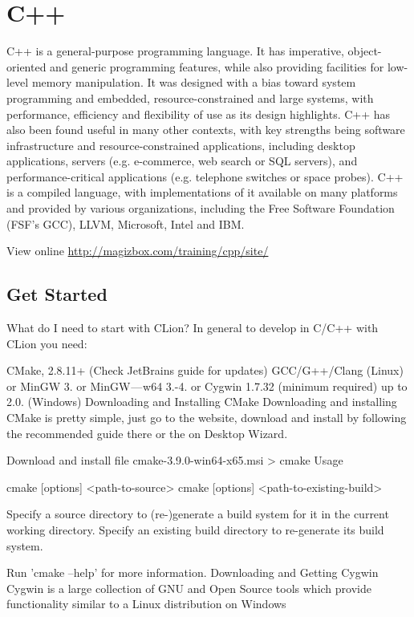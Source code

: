 \chapter{C++}


C++ is a general-purpose programming language. It has imperative, object-oriented and generic programming features, while also providing facilities for low-level memory manipulation. It was designed with a bias toward system programming and embedded, resource-constrained and large systems, with performance, efficiency and flexibility of use as its design highlights. C++ has also been found useful in many other contexts, with key strengths being software infrastructure and resource-constrained applications, including desktop applications, servers (e.g. e-commerce, web search or SQL servers), and performance-critical applications (e.g. telephone switches or space probes). C++ is a compiled language, with implementations of it available on many platforms and provided by various organizations, including the Free Software Foundation (FSF's GCC), LLVM, Microsoft, Intel and IBM.

View online \href{http://magizbox.com/training/cpp/site/}{http://magizbox.com/training/cpp/site/}

\section{Get Started}

What do I need to start with CLion?
In general to develop in C/C++ with CLion you need:

CMake, 2.8.11+ (Check JetBrains guide for updates)
GCC/G++/Clang (Linux) or
MinGW 3. or MinGW — w64 3.-4. or Cygwin 1.7.32 (minimum required) up to 2.0. (Windows)
Downloading and Installing CMake
Downloading and installing CMake is pretty simple, just go to the website, download and install by following the recommended guide there or the on Desktop Wizard.

Download and install file cmake-3.9.0-win64-x65.msi
> cmake
Usage

  cmake [options] <path-to-source>
  cmake [options] <path-to-existing-build>

Specify a source directory to (re-)generate a build system for it in the
current working directory.  Specify an existing build directory to
re-generate its build system.

Run 'cmake --help' for more information.
Downloading and Getting Cygwin
Cygwin is a large collection of GNU and Open Source tools which provide functionality similar to a Linux distribution on Windows

